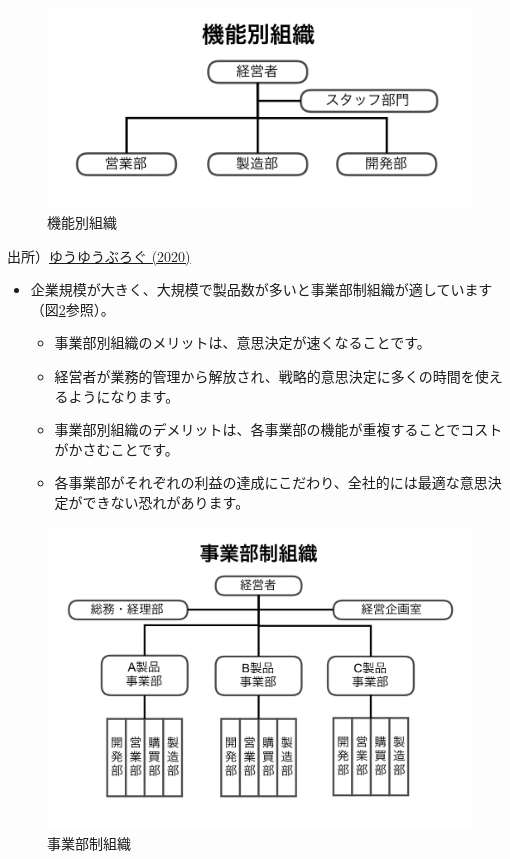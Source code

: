 \documentclass[
]{book}
\begin{document}
\begin{figure}
\includegraphics[width=960px]{org1} \caption{機能別組織}\label{fig:org1}
\end{figure}

出所）\href{https://life-is-yuyu.com/consultant/business-management/function-divisional/}{ゆうゆうぶろぐ (2020)}

\begin{itemize}
\item
  企業規模が大きく、大規模で製品数が多いと事業部制組織が適しています（図\ref{fig:org2}参照）。

  \begin{itemize}
  \item
    事業部別組織のメリットは、意思決定が速くなることです。
  \item
    経営者が業務的管理から解放され、戦略的意思決定に多くの時間を使えるようになります。
  \item
    事業部別組織のデメリットは、各事業部の機能が重複することでコストがかさむことです。
  \item
    各事業部がそれぞれの利益の達成にこだわり、全社的には最適な意思決定ができない恐れがあります。
  \end{itemize}
\end{itemize}

\begin{figure}
\includegraphics[width=960px]{org2} \caption{事業部制組織}\label{fig:org2}
\end{figure}
\end{document}

